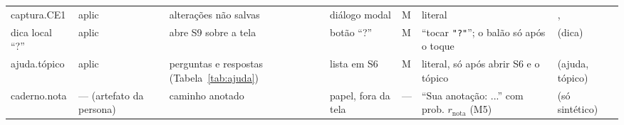 \begin{tabularx}{\textwidth}{@{}P{2.2cm}P{0.9cm}P{2.6cm}P{2.2cm}P{0.5cm}YP{2.3cm}@{}}
captura.CE1 & aplic & alterações não salvas & diálogo modal & M & literal & ,  \\
dica local ``?'' & aplic & abre S9 sobre a tela & botão ``?'' & M & ``tocar \texttt{"?"}''; o balão só após o toque & (dica) \\
ajuda.tópico & aplic & perguntas e respostas (Tabela~\ref{tab:ajuda}) & lista em S6 & M & literal, só após abrir S6 e o tópico & (ajuda, tópico) \\
caderno.nota & --- (artefato da persona) & caminho anotado & papel, fora da tela & --- & ``Sua anotação: ...'' com prob. $r_{\mathrm{nota}}$ (M5) &  (só sintético) \\
\bottomrule
\end{tabularx}
